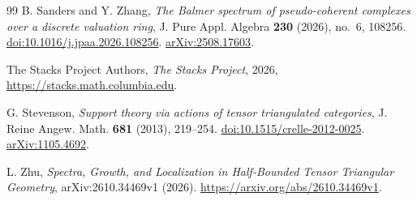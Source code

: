 \documentclass[11pt]{amsart}
\numberwithin{equation}{section}
\theoremstyle{definition}
\theoremstyle{remark}
\begin{document}
\begin{thebibliography}{99}
B. Sanders and Y. Zhang,
\emph{The Balmer spectrum of pseudo-coherent complexes over a discrete valuation ring},
J. Pure Appl. Algebra \textbf{230} (2026), no.~6, 108256.
\href{https://doi.org/10.1016/j.jpaa.2026.108256}{doi:10.1016/j.jpaa.2026.108256}.
\href{https://arxiv.org/abs/2508.17603}{arXiv:2508.17603}.

The Stacks Project Authors,
\emph{The Stacks Project}, 2026,
\url{https://stacks.math.columbia.edu}.

G. Stevenson,
\emph{Support theory via actions of tensor triangulated categories},
J. Reine Angew. Math. \textbf{681} (2013), 219--254.
\href{https://doi.org/10.1515/crelle-2012-0025}{doi:10.1515/crelle-2012-0025}.
\href{https://arxiv.org/abs/1105.4692}{arXiv:1105.4692}.

L. Zhu,
\emph{Spectra, Growth, and Localization in Half-Bounded Tensor Triangular Geometry},
arXiv:2610.34469v1 (2026).
\url{https://arxiv.org/abs/2610.34469v1}.

\end{thebibliography}
\end{document}
